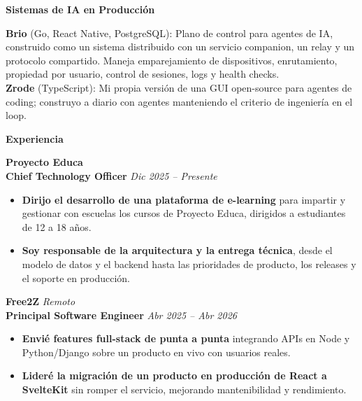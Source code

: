 \documentclass[11pt]{article}
\begin{document}
\vspace{8pt}
\begin{center}
    \textbf{Sistemas de IA en Producción}
\end{center}
\vspace{-4pt}
\textbf{Brio} (Go, React Native, PostgreSQL): Plano de control para agentes de IA, construido como un sistema distribuido con un servicio companion, un relay y un protocolo compartido. Maneja emparejamiento de dispositivos, enrutamiento, propiedad por usuario, control de sesiones, logs y health checks. \\
\textbf{Zrode} (TypeScript): Mi propia versión de una GUI open-source para agentes de coding; construyo a diario con agentes manteniendo el criterio de ingeniería en el loop.

\vspace{8pt}
\begin{center}
    \textbf{Experiencia}
\end{center}
\vspace{-4pt}

\textbf{Proyecto Educa} \\
\textbf{Chief Technology Officer} \hfill \textit{Dic 2025 -- Presente}
\begin{itemize}
    \item \textbf{Dirijo el desarrollo de una plataforma de e-learning} para impartir y gestionar con escuelas los cursos de Proyecto Educa, dirigidos a estudiantes de 12 a 18 años.
    \item \textbf{Soy responsable de la arquitectura y la entrega técnica}, desde el modelo de datos y el backend hasta las prioridades de producto, los releases y el soporte en producción.
\end{itemize}

\vspace{10pt}
\textbf{Free2Z} \hfill \textit{Remoto} \\
\textbf{Principal Software Engineer} \hfill \textit{Abr 2025 -- Abr 2026}
\begin{itemize}
    \item \textbf{Envié features full-stack de punta a punta} integrando APIs en Node y Python/Django sobre un producto en vivo con usuarios reales.
    \item \textbf{Lideré la migración de un producto en producción de React a SvelteKit} sin romper el servicio, mejorando mantenibilidad y rendimiento.
\end{itemize}
\end{document}
